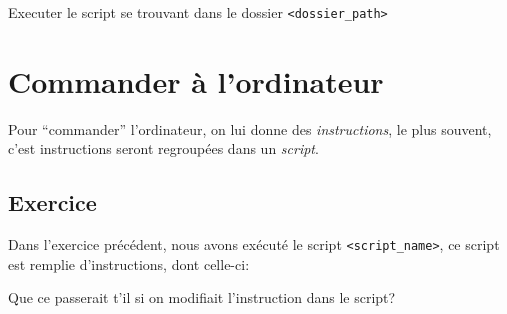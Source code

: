 \documentclass[12pt,a4paper]{book}
\newcommand{\path}[1]{\texttt{#1}}
\begin{document}
Executer le script se trouvant dans le dossier \path{<dossier\_path>}

\section{Commander à l'ordinateur}

Pour ``commander'' l’ordinateur, on lui donne des \emph{instructions}, le plus souvent, c’est instructions seront regroupées dans un \emph{script}.

\subsection{Exercice}

Dans l’exercice précédent, nous avons exécuté le script \path{<script\_name>}, ce script est remplie d’instructions, dont celle-ci:


Que ce passerait t’il si on modifiait l’instruction dans le script?
\end{document}
